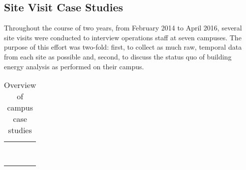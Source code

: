 \subsection{Site Visit Case Studies}
\label{sec:sitevisit}
Throughout the course of two years, from February 2014 to April 2016, several site visits were conducted to interview operations staff at seven campuses. The purpose of this effort was two-fold: first, to collect as much raw, temporal data from each site as possible and, second, to discuss the status quo of building energy analysis as performed on their campus.

\begin{table} 
    \begin{tabular}{ c c c }
         &  &  \\ 
         &  &  \\ 
         &  &  \\ 
         &  &  \\ 
         &  &  \\ 
         &  &  \\ 
         &  &  \\ 
         &  &  \\ 
    \end{tabular} 
    \caption{Overview of campus case studies} 
\end{table}